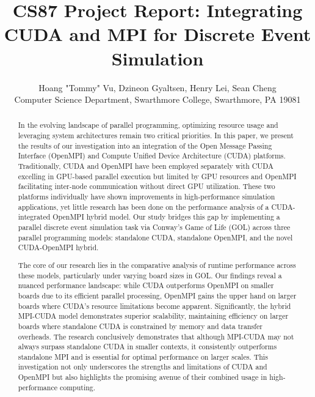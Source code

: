 \documentclass[11pt,twocolumn]{article}
\begin{document}
\title{CS87 Project Report: 
Integrating CUDA and MPI for Discrete Event Simulation}

\author{Hoang "Tommy" Vu, Dzineon Gyaltsen, Henry Lei, Sean Cheng \\
Computer Science Department, Swarthmore College, Swarthmore, PA  19081}

\maketitle

\begin{abstract}

In the evolving landscape of parallel programming, optimizing resource usage and 
leveraging system architectures remain two critical priorities. In this paper, we present the results of our investigation into an integration of the Open Message Passing Interface (OpenMPI) and Compute Unified Device Architecture (CUDA) platforms. Traditionally, CUDA and OpenMPI have been employed separately with CUDA excelling in GPU-based parallel execution but limited by GPU resources and OpenMPI facilitating inter-node communication without direct GPU utilization. These two platforms individually have shown improvements in high-performance simulation applications, yet little research has been done on the performance analysis of a CUDA-integrated OpenMPI hybrid model. Our study bridges this gap by implementing a parallel discrete event simulation task via Conway's Game of Life (GOL) across three parallel programming models: standalone CUDA, standalone OpenMPI, and the novel CUDA-OpenMPI hybrid.

The core of our research lies in the comparative analysis of runtime performance across these models, particularly under varying board sizes in GOL. Our findings reveal a nuanced performance landscape: while CUDA outperforms OpenMPI on smaller boards due to its efficient parallel processing, OpenMPI gains the upper hand on larger boards where CUDA's resource limitations become apparent. Significantly, the hybrid MPI-CUDA model demonstrates superior scalability, maintaining efficiency on larger boards where standalone CUDA is constrained by memory and data transfer overheads. The research conclusively demonstrates that although MPI-CUDA may not always surpass standalone CUDA in smaller contexts, it consistently outperforms standalone MPI and is essential for optimal performance on larger scales. This investigation not only underscores the strengths and limitations of CUDA and OpenMPI but also highlights the promising avenue of their combined usage in high-performance computing.

\end{abstract}
\end{document}
